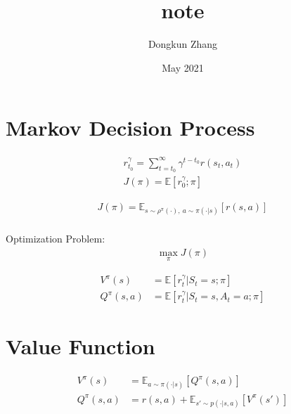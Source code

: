 
\usepackage[utf8]{inputenc}



\title{note}
\author{Dongkun Zhang}
\date{May 2021}



\maketitle

\section{Markov Decision Process}







\begin{align*}
    r_{t_0}^{\gamma} = \sum_{t=t_0}^{\infty}\gamma^{t-t_0}r(s_t,a_t) \\
    J(\pi) = \mathbb{E}[ r_0^{\gamma} ;\pi]
\end{align*}


\begin{align*}
    J(\pi) = \mathbb{E}_{s \sim \rho^{\pi}(\cdot), \ a \sim \pi(\cdot|s)}[r(s,a)] \\
\end{align*}


Optimization Problem:
\begin{align*}
    \max_{\pi} J(\pi)
\end{align*}



\begin{align*}
    V^{\pi}(s) &= \mathbb{E}[r_t^{\gamma} | S_t=s; \pi] \\
    Q^{\pi}(s,a) &= \mathbb{E}[r_t^{\gamma} | S_t=s, A_t=a; \pi]
\end{align*}



\section{Value Function}

 
\begin{align*}
    V^{\pi}(s) &= \mathbb{E}_{a \sim \pi(\cdot|s)}[Q^{\pi}(s,a)] \\
    Q^{\pi}(s,a)&= r(s,a) + \mathbb{E}_{s' \sim p(\cdot|s,a)}[V^{\pi}(s')]
\end{align*}




